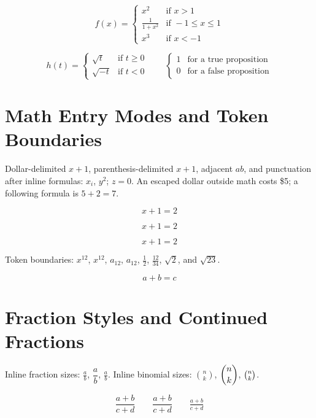 \documentclass[12pt]{article}
\begin{document}
\begin{equation}
f(x) = \begin{cases}
x^2 & \text{if } x > 1 \\
\frac{1}{1+x^2} & \text{if } -1 \leq x \leq 1 \\
x^3 & \text{if } x < -1
\end{cases}
\end{equation}

\begin{equation}
h(t) = \begin{cases}
\sqrt{t} & \text{if } t \geq 0 \\
\sqrt{-t} & \text{if } t < 0
\end{cases}
\qquad
\begin{cases}
1 & \text{for a true proposition} \\
0 & \text{for a false proposition}
\end{cases}
\end{equation}

\section{Math Entry Modes and Token Boundaries}

Dollar-delimited $x+1$, parenthesis-delimited \(x+1\), adjacent $a$$b$,
and punctuation after inline formulas: $x_i$, $y^2$; $z=0$.
An escaped dollar outside math costs \$5; a following formula is $5+2=7$.

\[
x+1=2
\]

$$
x+1=2
$$

\begin{equation*}
x+1=2
\end{equation*}

Token boundaries: $x^12$, $x^{12}$, $a_12$, $a_{12}$,
$\frac12$, $\frac{12}{34}$, $\sqrt2$, and $\sqrt{23}$.

\[
a + %
b = c
\]

\section{Fraction Styles and Continued Fractions}

Inline fraction sizes: $\frac{a}{b}$, $\dfrac{a}{b}$, $\tfrac{a}{b}$.
Inline binomial sizes: $\binom{n}{k}$, $\dbinom{n}{k}$, $\tbinom{n}{k}$.

\[
\frac{a+b}{c+d} \qquad \dfrac{a+b}{c+d} \qquad \tfrac{a+b}{c+d}
\]
\end{document}
